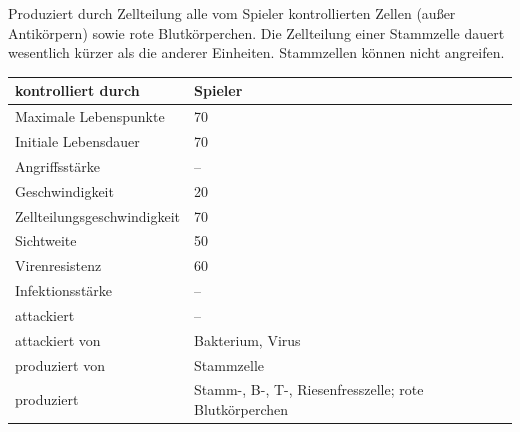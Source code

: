 \newcommand\cellentry[9]{%
  \minisec{#1}%
  #4%

  \begin{tabular} {|l|p{9cm}|}%
    \hline%
    kontrolliert durch          & #3\\\hline%
    Maximale Lebenspunkte       & #5\\\hline%
    Initiale Lebensdauer        & #6\\\hline%
    Angriffsstärke              & #7\\\hline%
    Geschwindigkeit             & #8\\\hline%
    Zellteilungsgeschwindigkeit & #9\\\hline%
}%

\newcommand\cellentryctd[7]{%
    Sichtweite                  & #1\\\hline%
    Virenresistenz              & #2\\\hline%
    Infektionsstärke            & #3\\\hline%
    attackiert                  & #4\\\hline%
    attackiert von              & #5\\\hline%
    produziert von              & #6\\\hline%
    produziert                  & #7\\\hline%
  \end{tabular}%
}

\cellentry
  {Stammzelle}
  {stemcellorig}
  {Spieler}
  {Produziert durch Zellteilung alle vom Spieler kontrollierten
   Zellen (außer Antikörpern) sowie rote Blutkörperchen.
   Die Zellteilung einer Stammzelle dauert
   wesentlich kürzer als die anderer Einheiten. Stammzellen können nicht
   angreifen.
  }
  {70} %
  {70} %
  {--} %
  {20} %
  {70} %
\cellentryctd
  {50} %
  {60} %
  {--} %
  {--} %
  {Bakterium, Virus} %
  {Stammzelle} %
  {Stamm-, B-, T-, Riesenfresszelle; rote Blutkörperchen} %

